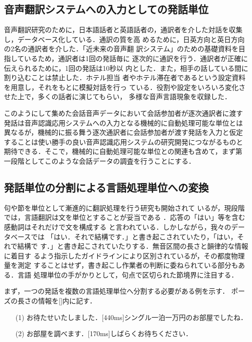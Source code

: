 \subsection{音声翻訳システムへの入力としての発話単位}

音声翻訳研究のために，日本語話者と英語話者の，通訳者を介した対話を収集
し，データベース化している\cite{Morimoto94,Takezawa98b}．通訳の質を高
めるために，日英方向と英日方向の2名の通訳者を介した．「近未来の音声翻
訳システム」のための基礎資料を目指しているため，通訳者は1回の発話毎に
逐次的に通訳を行う．通訳者が正確に伝えられるために，1回の発話は10秒以
内とした．また，相手の話している間に割り込むことは禁止した．ホテル担当
者やホテル滞在者であるという設定資料を用意し，それをもとに模擬対話を行っ
ている．役割や設定をいろいろ変化させた上で，多くの話者に演じてもらい，
多様な音声言語現象を収録した．

このようにして集めた会話音声データにおいて会話参加者が逐次通訳者に渡す
発話は音声認識応用システムへの入力となる機械的に自動処理可能な単位とは
異なるが，機械的に振る舞う逐次通訳者に会話参加者が渡す発話を入力と仮定
することは使い勝手の良い音声認識応用システムの研究開発につながるものと
期待できる．そこで，機械的に自動処理可能な単位との関連も含めて，まず第
一段階としてこのような会話データの調査を行うことにする．

\subsection{発話単位の分割による言語処理単位への変換}

句や節を単位として漸進的に翻訳処理を行う研究\cite{Mima97}も開始されて
いるが，現段階では，言語翻訳は文を単位とすることが妥当である
\cite{Furuse97}．応答の「はい」等を含む感動詞はそれだけで文を構成する
と言われている\cite{Masuoka92}．しかしながら，我々のデータベースでは
「はい．それで結構です．」と書き起こされていたり，「はい，それで結構で
す．」と書き起こされていたりする．無音区間の長さと韻律的な情報に着目す
るよう指示したガイドラインにより区別されているが，その都度物理量を測定
することはせず，書き起こし作業者の判断に委ねられている部分もある．言語
処理単位の手がかりとして，句点で区切られた節境界に注目する．

まず，一つの発話を複数の言語処理単位へ分割する必要がある例を示す．
ポーズの長さの情報を[]内に記す．

\begin{itemize}
\item[(1)] お待たせいたしました．[440ms]シングル一泊一万円のお部屋でしたね．
\item[(2)] お部屋を調べます．[170ms]しばらくお待ちください．
\end{itemize}

